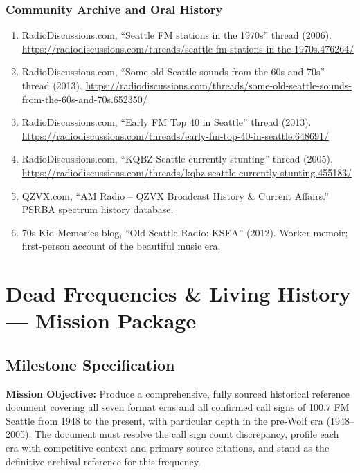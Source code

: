 \documentclass[11pt,letterpaper]{article}
\newcommand{\stageheader}[2]{%
  \noindent\colorbox{#2}{\makebox[\textwidth][l]{%
    \textcolor{white}{\bfseries\sffamily\hspace{6pt}#1\hspace{6pt}}}}%
  \vspace{0.5em}\par%
}
\begin{document}
\subsubsection{Community Archive and Oral History}
\begin{enumerate}[leftmargin=2em, start=18]
  \item RadioDiscussions.com, ``Seattle FM stations in the 1970s'' thread (2006). \url{https://radiodiscussions.com/threads/seattle-fm-stations-in-the-1970s.476264/}
  \item RadioDiscussions.com, ``Some old Seattle sounds from the 60s and 70s'' thread (2013). \url{https://radiodiscussions.com/threads/some-old-seattle-sounds-from-the-60s-and-70s.652350/}
  \item RadioDiscussions.com, ``Early FM Top 40 in Seattle'' thread (2013). \url{https://radiodiscussions.com/threads/early-fm-top-40-in-seattle.648691/}
  \item RadioDiscussions.com, ``KQBZ Seattle currently stunting'' thread (2005). \url{https://radiodiscussions.com/threads/kqbz-seattle-currently-stunting.455183/}
  \item QZVX.com, ``AM Radio -- QZVX Broadcast History \& Current Affairs.'' PSRBA spectrum history database.
  \item 70s Kid Memories blog, ``Old Seattle Radio: KSEA'' (2012). Worker memoir; first-person account of the beautiful music era.
\end{enumerate}

\newpage
\stageheader{STAGE 3 --- MISSION PACKAGE}{tertiary}

\section{Dead Frequencies \& Living History --- Mission Package}

\subsection{Milestone Specification}

\textbf{Mission Objective:} Produce a comprehensive, fully sourced historical reference document covering all seven format eras and all confirmed call signs of 100.7 FM Seattle from 1948 to the present, with particular depth in the pre-Wolf era (1948--2005). The document must resolve the call sign count discrepancy, profile each era with competitive context and primary source citations, and stand as the definitive archival reference for this frequency.
\end{document}
